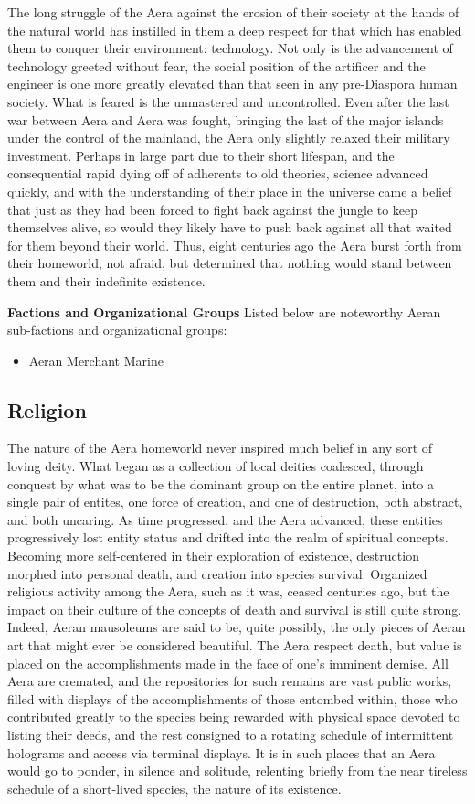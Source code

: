 The long struggle of the Aera against the erosion of their society at
the hands of the natural world has instilled in them a deep respect
for that which has enabled them to conquer their environment:
technology. Not only is the advancement of technology greeted without
fear, the social position of the artificer and the engineer is one
more greatly elevated than that seen in any pre-Diaspora human
society. What is feared is the unmastered and uncontrolled. Even after
the last war between Aera and Aera was fought, bringing the last of
the major islands under the control of the mainland, the Aera only
slightly relaxed their military investment. Perhaps in large part due
to their short lifespan, and the consequential rapid dying off of
adherents to old theories, science advanced quickly, and with the
understanding of their place in the universe came a belief that just
as they had been forced to fight back against the jungle to keep
themselves alive, so would they likely have to push back against all
that waited for them beyond their world. Thus, eight centuries ago the
Aera burst forth from their homeworld, not afraid, but determined that
nothing would stand between them and their indefinite existence.

{\bf Factions and Organizational Groups}
Listed below are noteworthy Aeran sub-factions and organizational groups: 
\begin{itemize}
\item Aeran Merchant Marine
\end{itemize}

\subsection{Religion}
The nature of the Aera homeworld never inspired much belief in any
sort of loving deity. What began as a collection of local deities
coalesced, through conquest by what was to be the dominant group on
the entire planet, into a single pair of entites, one force of
creation, and one of destruction, both abstract, and both uncaring. As
time progressed, and the Aera advanced, these entities progressively
lost entity status and drifted into the realm of spiritual
concepts. Becoming more self-centered in their exploration of
existence, destruction morphed into personal death, and creation into
species survival. Organized religious activity among the Aera, such as
it was, ceased centuries ago, but the impact on their culture of the
concepts of death and survival is still quite strong. Indeed, Aeran
mausoleums are said to be, quite possibly, the only pieces of Aeran
art that might ever be considered beautiful. The Aera respect death,
but value is placed on the accomplishments made in the face of one's
imminent demise. All Aera are cremated, and the repositories for such
remains are vast public works, filled with displays of the
accomplishments of those entombed within, those who contributed
greatly to the species being rewarded with physical space devoted to
listing their deeds, and the rest consigned to a rotating schedule of
intermittent holograms and access via terminal displays. It is in such
places that an Aera would go to ponder, in silence and solitude,
relenting briefly from the near tireless schedule of a short-lived
species, the nature of its existence.

